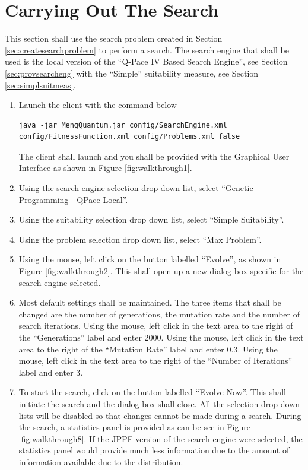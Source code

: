 \section{Carrying Out The Search}
\label{sec:carryingoutthesearch}

This section shall use the search problem created in Section \ref{sec:createsearchproblem} to perform a search.
The search engine that shall be used is the local version of the ``Q-Pace IV Based Search Engine'', see Section \ref{sec:provsearcheng} with the ``Simple'' suitability measure, see Section \ref{sec:simplsuitmeas}.

\begin{enumerate}
 \item Launch the client with the command below
\begin{lstlisting}
java -jar MengQuantum.jar config/SearchEngine.xml config/FitnessFunction.xml config/Problems.xml false
\end{lstlisting}
The client shall launch and you shall be provided with the Graphical User Interface as shown in Figure \ref{fig:walkthrough1}.

\item Using the search engine selection drop down list, select ``Genetic Programming - QPace Local''.

\item Using the suitability selection drop down list, select ``Simple Suitability''.

\item Using the problem selection drop down list, select ``Max Problem''.

\item Using the mouse, left click on the button labelled ``Evolve'', as shown in Figure \ref{fig:walkthrough2}.
This shall open up a new dialog box specific for the search engine selected.

\item \label{enum:searchsettings} Most default settings shall be maintained.
The three items that shall be changed are the number of generations, the mutation rate and the number of search iterations.
Using the mouse, left click in the text area to the right of the ``Generations'' label and enter $2000$.
Using the mouse, left click in the text area to the right of the ``Mutation Rate'' label and enter $0.3$.
Using the mouse, left click in the text area to the right of the ``Number of Iterations'' label and enter $3$.

\item To start the search, click on the button labelled ``Evolve Now''.
This shall initiate the search and the dialog box shall close.
All the selection drop down lists will be disabled so that changes cannot be made during a search.
During the search, a statistics panel is provided as can be see in Figure \ref{fig:walkthrough8}.
If the JPPF version of the search engine were selected,  the statistics panel would provide much less information due to the amount of information available due to the distribution.


\end{enumerate}
